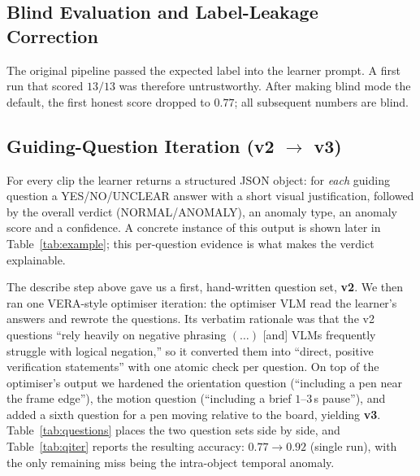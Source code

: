 \subsection{Blind Evaluation and Label-Leakage Correction}
The original pipeline passed the expected label into the learner prompt. A first run that
scored $13/13$ was therefore untrustworthy. After making blind mode the default, the
first honest score dropped to $0.77$; all subsequent numbers are blind.

\subsection{Guiding-Question Iteration (v2 $\rightarrow$ v3)}
For every clip the learner returns a structured JSON object: for \emph{each} guiding
question a YES/NO/UNCLEAR answer with a short visual justification, followed by the overall
verdict (NORMAL/ANOMALY), an anomaly type, an anomaly score and a confidence. A concrete
instance of this output is shown later in Table~\ref{tab:example}; this per-question
evidence is what makes the verdict explainable.

The describe step above gave us a first, hand-written question set, \textbf{v2}. We then
ran one VERA-style optimiser iteration: the optimiser VLM read the learner's answers and
rewrote the questions. Its verbatim rationale was that the v2 questions ``rely heavily on
negative phrasing $(\ldots)$ [and] VLMs frequently struggle with logical negation,'' so it
converted them into ``direct, positive verification statements'' with one atomic check per
question. On top of the optimiser's output we hardened the orientation question
(``including a pen near the frame edge''), the motion question (``including a brief
$1$--$3$\,s pause''), and added a sixth question for a pen moving relative to the board,
yielding \textbf{v3}. Table~\ref{tab:questions} places the two question sets side by side,
and Table~\ref{tab:qiter} reports the resulting accuracy: $0.77 \rightarrow 0.92$ (single
run), with the only remaining miss being the intra-object temporal anomaly.

